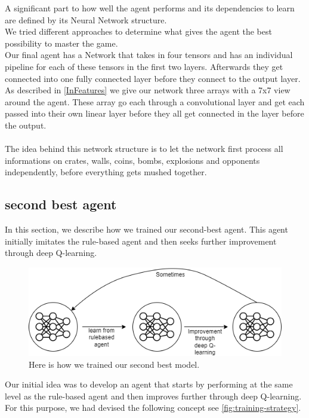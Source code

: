 A significant part to how well the agent performs and its dependencies to learn are defined by its Neural Network structure.\\
We tried different approaches to determine what gives the agent the best possibility to master the game.\\
Our final agent has a Network that takes in four tensors and has an individual pipeline for each of these tensors in the first two layers. Afterwards they get connected into one fully connected layer before they connect to the output layer.\\
As described in \ref{InFeatures} we give our network three arrays with a 7x7 view around the agent. These array go each through a convolutional layer and get each passed into their own linear layer before they all get connected in the layer before the output.\\ \\
The idea behind this network structure is to let the network first process all informations on crates, walls, coins, bombs, explosions and opponents independently, before everything gets mushed together.

\newpage
{}
\subsection{second best agent}

In this section, we describe how we trained our second-best agent. This agent initially imitates 
the rule-based agent and then seeks further improvement through deep Q-learning.

\begin{figure}[H]
    \centering
    
    \includegraphics[width=\oneImgWidth]{images/training-strategy}%
    
    \captionadjust%
    \caption{\label{fig:training-strategy} Here is how we trained our second best model.
    }%
\end{figure}

Our initial idea was to develop an agent that starts by performing at the same level as the rule-based agent and then improves 
further through deep Q-learning. For this purpose, we had devised the following concept see \autoref{fig:training-strategy}.


